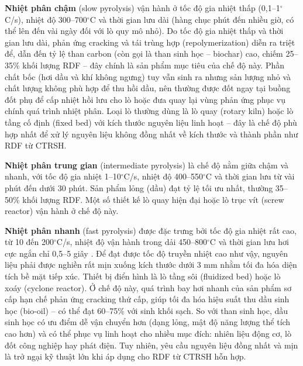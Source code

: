 \documentclass[../main.tex]{subfiles}
\begin{document}
\textbf{Nhiệt phân chậm} (slow pyrolysis) vận hành ở tốc độ gia nhiệt thấp (0{,}1--1$^{\circ}$C/s), nhiệt độ 300--700$^{\circ}$C và thời gian lưu dài (hàng chục phút đến nhiều giờ, có thể lên đến vài ngày đối với lò quy mô nhỏ). Do tốc độ gia nhiệt thấp và thời gian lưu dài, phản ứng cracking và tái trùng hợp (repolymerization) diễn ra triệt để, dẫn đến tỷ lệ than carbon (còn gọi là than sinh học -- biochar) cao, chiếm 25--35\% khối lượng RDF -- đây chính là sản phẩm mục tiêu của chế độ này. Phần chất bốc (hơi dầu và khí không ngưng) tuy vẫn sinh ra nhưng sản lượng nhỏ và chất lượng không phù hợp để thu hồi dầu, nên thường được đốt ngay tại buồng đốt phụ để cấp nhiệt hồi lưu cho lò hoặc đưa quay lại vùng phản ứng phục vụ chính quá trình nhiệt phân. Loại lò thường dùng là lò quay (rotary kiln) hoặc lò tầng cố định (fixed bed) với kích thước nguyên liệu linh hoạt -- đây là chế độ phù hợp nhất để xử lý nguyên liệu không đồng nhất về kích thước và thành phần như RDF từ CTRSH.

\textbf{Nhiệt phân trung gian} (intermediate pyrolysis) là chế độ nằm giữa chậm và nhanh, với tốc độ gia nhiệt 1--10$^{\circ}$C/s, nhiệt độ 400--550$^{\circ}$C và thời gian lưu từ vài phút đến dưới 30 phút. Sản phẩm lỏng (dầu) đạt tỷ lệ tối ưu nhất, thường 35--50\% khối lượng RDF. Một số thiết kế lò quay hiện đại hoặc lò trục vít (screw reactor) vận hành ở chế độ này.

\textbf{Nhiệt phân nhanh} (fast pyrolysis) được đặc trưng bởi tốc độ gia nhiệt rất cao, từ 10 đến 200$^{\circ}$C/s, nhiệt độ vận hành trong dải 450--800$^{\circ}$C và thời gian lưu hơi cực ngắn chỉ 0{,}5--5 giây \cite{Bridgwater2012}. Để đạt được tốc độ truyền nhiệt cao như vậy, nguyên liệu phải được nghiền rất mịn xuống kích thước dưới 3 mm nhằm tối đa hóa diện tích bề mặt tiếp xúc. Thiết bị điển hình là lò tầng sôi (fluidized bed) hoặc lò xoáy (cyclone reactor). Ở chế độ này, quá trình bay hơi nhanh của sản phẩm sơ cấp hạn chế phản ứng cracking thứ cấp, giúp tối đa hóa hiệu suất thu dầu sinh học (bio-oil) -- có thể đạt 60--75\% với sinh khối sạch. So với than sinh học, dầu sinh học có ưu điểm dễ vận chuyển hơn (dạng lỏng, mật độ năng lượng thể tích cao hơn) và có thể phục vụ linh hoạt cho nhiều mục đích: nhiên liệu động cơ, lò đốt công nghiệp hay phát điện. Tuy nhiên, yêu cầu nguyên liệu đồng nhất và mịn là trở ngại kỹ thuật lớn khi áp dụng cho RDF từ CTRSH hỗn hợp.
\end{document}
